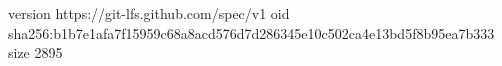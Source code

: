version https://git-lfs.github.com/spec/v1
oid sha256:b1b7e1afa7f15959c68a8acd576d7d286345e10c502ca4e13bd5f8b95ea7b333
size 2895
